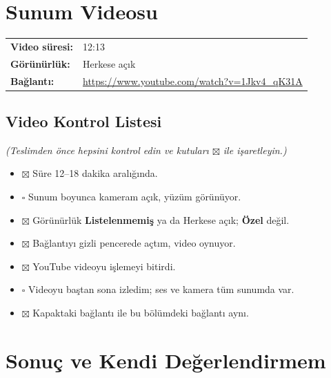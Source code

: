 \documentclass[12pt,a4paper]{article}
\newcommand{\aciklama}[1]{{\color{gray}\itshape (#1)}}
\begin{document}
\section{Sunum Videosu}
\begin{center}
\begin{tabular}{@{}ll@{}}
\textbf{Video süresi:} & 12:13  \\
\textbf{Görünürlük:} & Herkese açık \\
\textbf{Bağlantı:} & \url{https://www.youtube.com/watch?v=1Jkv4_qK31A} \\
\end{tabular}
\end{center}

\subsection{Video Kontrol Listesi}
\aciklama{Teslimden önce hepsini kontrol edin ve kutuları $\boxtimes$ ile işaretleyin.}
\begin{itemize}
  \item[] $\boxtimes$ Süre 12--18 dakika aralığında.
  \item[] $\square$ Sunum boyunca kameram açık, yüzüm görünüyor.
  \item[] $\boxtimes$ Görünürlük \textbf{Listelenmemiş} ya da Herkese açık; \textbf{Özel} değil.
  \item[] $\boxtimes$ Bağlantıyı gizli pencerede açtım, video oynuyor.
  \item[] $\boxtimes$ YouTube videoyu işlemeyi bitirdi.
  \item[] $\square$ Videoyu baştan sona izledim; ses ve kamera tüm sunumda var.
  \item[] $\boxtimes$ Kapaktaki bağlantı ile bu bölümdeki bağlantı aynı.
\end{itemize}


\newpage
\section{Sonuç ve Kendi Değerlendirmem}
 
\end{document}
